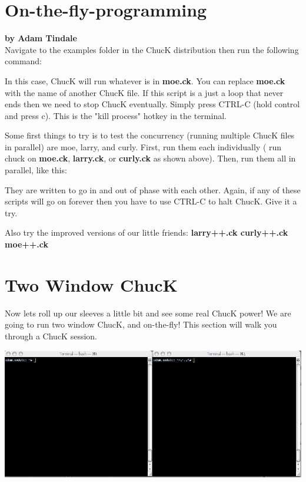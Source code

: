 \section{On-the-fly-programming}
\textbf{by Adam Tindale}\\

Navigate to the examples folder in the ChucK distribution then run the following command:


In this case, ChucK will run whatever is in {\bf moe.ck}. You can replace {\bf moe.ck} with the name of another ChucK file. If this script is a just a loop that never ends then we need to stop ChucK eventually. Simply press CTRL-C (hold control and press c). This is the "kill process" hotkey in the terminal. 

Some first things to try is to test the concurrency (running multiple ChucK files in parallel) are moe, larry, and curly. First, run them each individually ( run chuck on {\bf moe.ck}, {\bf larry.ck}, or {\bf curly.ck} as shown above).  Then, run them all in parallel, like this:


They are written to go in and out of phase with each other.  Again, if any of these scripts will go on forever then you have to use CTRL-C to halt ChucK. 
Give it a try. 

Also try the improved versions of our little friends: {\bf larry++.ck curly++.ck moe++.ck} 

\section*{Two Window ChucK}
Now lets roll up our sleeves a little bit and see some real ChucK power! We are going to run two window ChucK, and on-the-fly! This section will walk you through a ChucK session. 

\includegraphics[width=\textwidth]{images/2term}

